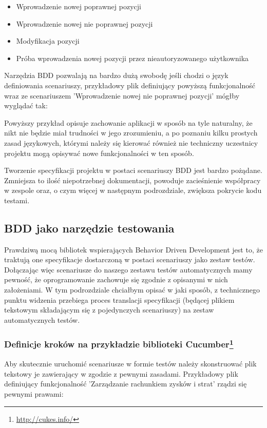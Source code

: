       \begin{itemize}
        \item Wprowadzenie nowej poprawnej pozycji
        \item Wprowadzenie nowej nie poprawnej pozycji
        \item Modyfikacja pozycji
        \item Próba wprowadzenia nowej pozycji przez nieautoryzowanego użytkownika
      \end{itemize}
      
      Narzędzia BDD pozwalają na bardzo dużą swobodę jeśli chodzi o język definiowania scenariuszy, przykładowy plik definiujący powyższą funkcjonalność wraz ze scenariuszem 'Wprowadzenie nowej nie poprawnej pozycji' mógłby wyglądać tak:
      


    Powyższy przykład opisuje zachowanie aplikacji w sposób na tyle naturalny, że nikt nie będzie miał trudności w jego zrozumieniu, a po poznaniu kilku prostych zasad językowych, którymi należy się kierować również nie techniczny uczestnicy projektu mogą opisywać nowe funkcjonalności w ten sposób.
    
    Tworzenie specyfikacji projektu w postaci scenariuszy BDD jest bardzo pożądane. Zmniejsza to ilość niepotrzebnej dokumentacji, powoduje zacieśnienie współpracy w zespole oraz, o czym więcej w następnym podrozdziale, zwiększa pokrycie kodu testami.
    
    \subsection{BDD jako narzędzie testowania}
      Prawdziwą mocą bibliotek wspierających Behavior Driven Development jest to, że traktują one specyfikacje dostarczoną w postaci scenariuszy jako zestaw testów. Dołączając więc scenariusze do naszego zestawu testów automatycznych mamy pewność, że oprogramowanie zachowuje się zgodnie z opisanymi w nich założeniami. W tym podrozdziale chciałbym opisać w jaki sposób, z technicznego punktu widzenia przebiega proces translacji specyfikacji (będącej plikiem tekstowym składającym się z pojedynczych scenariuszy) na zestaw automatycznych testów.
      \subsubsection[Definicje kroków na przykładzie biblioteki Cucumber]{Definicje kroków na przykładzie biblioteki Cucumber\footnote{\url{http://cukes.info/}\nocite{cucumber}}}
        Aby skutecznie uruchomić scenariusze w formie testów należy skonstruować plik tekstowy je zawierający w zgodzie z pewnymi zasadami. Przykładowy plik definiujący funkcjonalność 'Zarządzanie rachunkiem zysków i strat' rządzi się pewnymi prawami:
        
